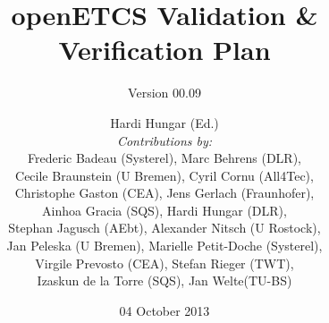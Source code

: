 \documentclass{template/openetcs_report}
\begin{document}
\frontmatter
{}




\title{openETCS Validation \& Verification Plan}

\subtitle{Version 00.09}

\date{04 October 2013}


\author{
Hardi Hungar (Ed.)\\
\small
{\it Contributions by:} \\
 Frederic Badeau (Systerel), Marc Behrens (DLR),\\
  Cecile Braunstein (U Bremen), Cyril Cornu (All4Tec),\\
 Christophe Gaston (CEA), Jens Gerlach (Fraunhofer),\\
 Ainhoa Gracia (SQS), Hardi Hungar (DLR),\\
Stephan Jagusch (AEbt), Alexander Nitsch (U Rostock),\\
 Jan Peleska (U Bremen), Marielle Petit-Doche (Systerel),\\
 Virgile Prevosto (CEA),  Stefan Rieger (TWT),\\ 
Izaskun de la Torre (SQS), Jan Welte(TU-BS)}


  

\end{document}
